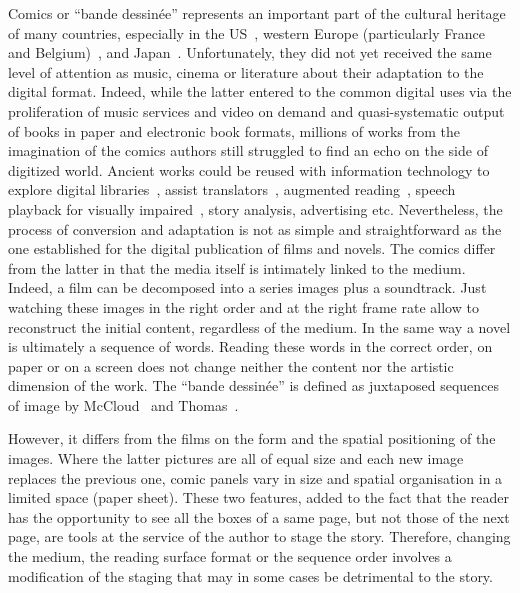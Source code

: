 Comics or ``bande dessin{\'e}e'' represents an important part of the cultural heritage of many countries, especially in the US~\cite{Stewart2000,IBISWorld2013}, western Europe (particularly France and Belgium)~\cite{Ratier2013}, and Japan~\cite{Japan2013}.
Unfortunately, they did not yet received the same level of attention as music, cinema or literature about their adaptation to the digital format.
Indeed, while the latter entered to the common digital uses via the proliferation of music services and video on demand and quasi-systematic output of books in paper and electronic book formats, millions of works from the imagination of the comics authors still struggled to find an echo on the side of digitized world.
Ancient works could be reused with information technology to explore digital libraries~\cite{Back2001}, assist translators~\cite{borodo2014multimodality}, augmented reading~\cite{Singh2004,Raulet2013Comics}, speech playback for visually impaired~\cite{Brandon2014,Ponsard09}, story analysis, advertising etc.
Nevertheless, the process of conversion and adaptation is not as simple and straightforward as the one established for the digital publication of films and novels.
The comics differ from the latter in that the media itself is intimately linked to the medium.
Indeed, a film can be decomposed into a series images plus a soundtrack. Just watching these images in the right order and at the right frame rate allow to reconstruct the initial content, regardless of the medium. 
In the same way a novel is ultimately a sequence of words.
Reading these words in the correct order, on paper or on a screen does not change neither the content nor the artistic dimension of the work.
The ``bande dessinée'' is defined as juxtaposed sequences of image by McCloud~\cite{McCloud94} and Thomas~\cite{Thomas2010Invisible}.

However, it differs from the films on the form and the spatial positioning of the images.
Where the latter pictures are all of equal size and each new image replaces the previous one, comic panels vary in size and spatial organisation in a limited space (paper sheet).
These two features, added to the fact that the reader has the opportunity to see all the boxes of a
same page, but not those of the next page, are tools at the service of the author to stage the story.
Therefore, changing the medium, the reading surface format or the sequence order involves a modification of the staging that may in some cases be detrimental to the story.

